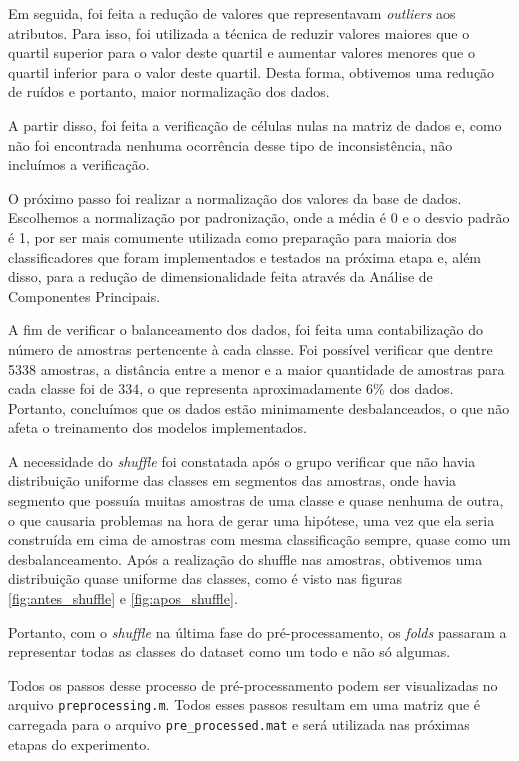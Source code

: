 \documentclass[10pt, conference, compsocconf]{IEEEtran}
\begin{document}
Em seguida, foi feita a redução de valores que representavam \textit{outliers} 
aos atributos. Para isso, foi utilizada a técnica de reduzir valores maiores 
que o quartil superior para o valor deste quartil e aumentar valores menores 
que o quartil inferior para o valor deste quartil. Desta forma, obtivemos uma 
redução de ruídos e portanto, maior normalização dos dados.

A partir disso, foi feita a verificação de células nulas na matriz de dados
e, como não foi encontrada nenhuma ocorrência desse tipo de inconsistência, 
não incluímos a verificação.

O próximo passo foi realizar a normalização dos valores da base de dados. Escolhemos 
a normalização por padronização, onde a média é 0 e o desvio padrão é 1, por 
ser mais comumente utilizada como preparação para maioria dos classificadores
que foram implementados e testados na próxima etapa e, além disso, para a redução 
de dimensionalidade feita através da Análise de Componentes Principais.

A fim de verificar o balanceamento dos dados, foi feita uma contabilização do número 
de amostras pertencente à cada classe. Foi possível verificar que dentre 5338 
amostras, a distância entre a menor e a maior quantidade de amostras para cada 
classe foi de $334$, o que representa aproximadamente $6\%$ dos dados. Portanto, 
concluímos que os dados estão minimamente desbalanceados, o que não afeta o
treinamento dos modelos implementados.

A necessidade do \textit{shuffle} foi constatada após o grupo verificar que 
não havia distribuição uniforme das classes em segmentos das amostras, onde 
havia segmento que possuía muitas amostras de uma classe e quase nenhuma de 
outra, o que causaria problemas na hora de gerar uma hipótese, uma vez que ela
seria construída em cima de amostras com mesma classificação sempre, quase como
um desbalanceamento. Após a 
realização do shuffle nas amostras, obtivemos uma distribuição quase uniforme 
das classes, como é visto nas figuras \ref{fig:antes_shuffle} e
\ref{fig:apos_shuffle}. 

Portanto, com o \textit{shuffle} na última fase do pré-processamento, os 
\textit{folds} passaram a representar todas as classes do dataset como um todo e
não só algumas.
 
Todos os passos desse processo de pré-processamento podem ser visualizadas no
arquivo \texttt{preprocessing.m}. Todos esses passos resultam em uma matriz que é carregada para
o arquivo \texttt{pre\_processed.mat} e será utilizada nas próximas etapas do experimento. 
\end{document}
